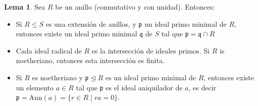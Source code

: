 \documentclass[letterpaper]{article}
\def\p{\mathfrak{p}}
\def\q{\mathfrak{q}}
\theoremstyle{definition}
\newtheorem{lem}[Satz]{Lema}
\begin{document}
\begin{lem}\label{commalg}
Sea $R$ be un anillo (conmutativo y con unidad). Entonces:
\begin{itemize}
\item Si $R \leq S$ es una extensi\'on de anillos, y $\p$ un ideal primo minimal de $R$, entonces existe un ideal primo minimal $\q$ de $S$ tal que $\p = \q \cap R$
\item Cada ideal radical de $R$ es la intersecci\'on de ideales primos. Si $R$ is noetheriano, entonces esta intersecci\'on es finita.
\item Si $R$ es noetheriano y $\p \unlhd R$ es un ideal primo minimal de $R$, entonces existe un elemento $a \in R$ tal que $\p$ es el ideal aniquilador de $a$, es decir $\p = \text{Ann}(a) = \{ r \in R \mid ra = 0 \}$.
\end{itemize}
\end{lem}
\end{document}

